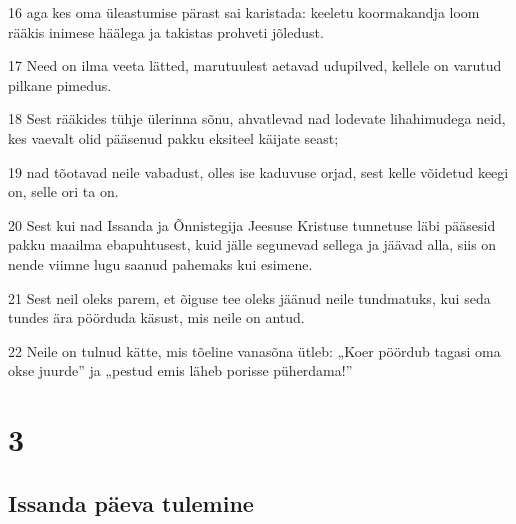 \par 16 aga kes oma üleastumise pärast sai karistada: keeletu koormakandja loom rääkis inimese häälega ja takistas prohveti jõledust.
\par 17 Need on ilma veeta lätted, marutuulest aetavad udupilved, kellele on varutud pilkane pimedus.
\par 18 Sest rääkides tühje ülerinna sõnu, ahvatlevad nad lodevate lihahimudega neid, kes vaevalt olid pääsenud pakku eksiteel käijate seast;
\par 19 nad tõotavad neile vabadust, olles ise kaduvuse orjad, sest kelle võidetud keegi on, selle ori ta on.
\par 20 Sest kui nad Issanda ja Õnnistegija Jeesuse Kristuse tunnetuse läbi pääsesid pakku maailma ebapuhtusest, kuid jälle segunevad sellega ja jäävad alla, siis on nende viimne lugu saanud pahemaks kui esimene.
\par 21 Sest neil oleks parem, et õiguse tee oleks jäänud neile tundmatuks, kui seda tundes ära pöörduda käsust, mis neile on antud.
\par 22 Neile on tulnud kätte, mis tõeline vanasõna ütleb: „Koer pöördub tagasi oma okse juurde” ja „pestud emis läheb porisse püherdama!”


\chapter{3}

\section*{Issanda päeva tulemine}

